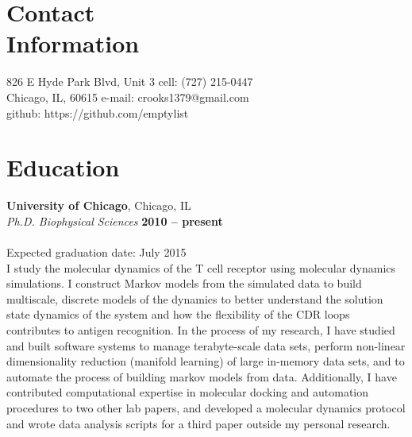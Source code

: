 \documentclass[margin,line]{resume}
\begin{document}
\begin{resume}

    \section{\mysidestyle Contact\\Information}
    826 E Hyde Park Blvd, Unit 3    
    \hfill cell: (727) 215-0447 
    \vspace{0mm} \\
    \vspace{0mm}
    Chicago, IL, 60615
    \hfill e-mail: crooks1379@gmail.com
    \vspace{0mm} \\
    \vspace{0mm}
    \hfill github: https://github.com/emptylist 
    \vspace{0mm} \\
    \vspace{-4.5mm}
    
    \section{\mysidestyle Education}

    \textbf{University of Chicago}, Chicago, IL \vspace{2mm} \\
    \vspace{1mm}
    \textsl{Ph.D. Biophysical Sciences} \hfill \textbf{ 2010 -- present} \vspace{-3mm}\\\vspace{-1mm}%
    \\
     Expected graduation date: July 2015 \\
     I study the molecular dynamics of the T cell receptor using molecular dynamics simulations.  I construct Markov models from the simulated data to build multiscale, discrete models of the dynamics to better understand the solution state dynamics of the system and how the flexibility of the CDR loops contributes to antigen recognition.  In the process of my research, I have studied and built software systems to manage terabyte-scale data sets, perform non-linear dimensionality reduction (manifold learning) of large in-memory data sets, and to automate the process of building markov models from data.  Additionally, I have contributed computational expertise in molecular docking and automation procedures to two other lab papers, and developed a molecular dynamics protocol and wrote data analysis scripts for a third paper outside my personal research.
    \vspace{-1mm}


\end{resume}
\end{document}
